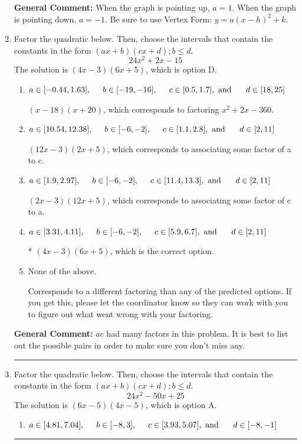 \documentclass{extbook}[14pt]
\newcommand{\litem}[1]{\item #1

\rule{\textwidth}{0.4pt}}
\begin{document}
\begin{enumerate}
{\textbf{General Comment:} When the graph is pointing up, $a=1$. When the graph is pointing down, $a=-1$. Be sure to use Vertex Form: $y = a(x-h)^2+k$.
}
\litem{
Factor the quadratic below. Then, choose the intervals that contain the constants in the form $(ax+b)(cx+d); b \leq d.$
\[ 24x^{2} +2 x -15 \]The solution is \( (4x -3)(6x + 5) \), which is option D.\begin{enumerate}[label=\Alph*.]
\item \( a \in [-0.44, 1.63], \hspace*{5mm} b \in [-19, -16], \hspace*{5mm} c \in [0.5, 1.7], \text{ and } \hspace*{5mm} d \in [18, 25] \)

 $(x -18)(x + 20)$, which corresponds to factoring $x^{2} +2 x -360$.
\item \( a \in [10.54, 12.38], \hspace*{5mm} b \in [-6, -2], \hspace*{5mm} c \in [1.1, 2.8], \text{ and } \hspace*{5mm} d \in [2, 11] \)

 $(12x -3)(2x + 5)$, which corresponds to associating some factor of a to c.
\item \( a \in [1.9, 2.97], \hspace*{5mm} b \in [-6, -2], \hspace*{5mm} c \in [11.4, 13.3], \text{ and } \hspace*{5mm} d \in [2, 11] \)

 $(2x -3)(12x + 5)$, which corresponds to associating some factor of c to a.
\item \( a \in [3.31, 4.11], \hspace*{5mm} b \in [-6, -2], \hspace*{5mm} c \in [5.9, 6.7], \text{ and } \hspace*{5mm} d \in [2, 11] \)

* $(4x -3)(6x + 5)$, which is the correct option.
\item \( \text{None of the above.} \)

 Corresponds to a different factoring than any of the predicted options. If you get this, please let the coordinator know so they can work with you to figure out what went wrong with your factoring.
\end{enumerate}

\textbf{General Comment:} $ac$ had many factors in this problem. It is best to list out the possible pairs in order to make sure you don't miss any.
}
\litem{
Factor the quadratic below. Then, choose the intervals that contain the constants in the form $(ax+b)(cx+d); b \leq d.$
\[ 24x^{2} -50 x + 25 \]The solution is \( (6x -5)(4x -5) \), which is option A.\begin{enumerate}[label=\Alph*.]
\item \( a \in [4.81, 7.04], \hspace*{5mm} b \in [-8, 3], \hspace*{5mm} c \in [3.93, 5.07], \text{ and } \hspace*{5mm} d \in [-8, -1] \)


\end{enumerate}}
\end{enumerate}
\end{document}
